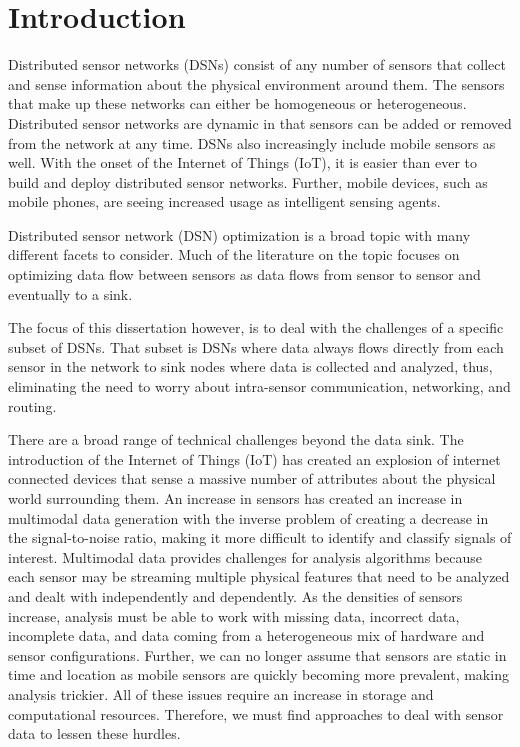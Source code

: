 \chapter{Introduction}\label{ch:introduction}
Distributed sensor networks (DSNs) consist of any number of sensors that collect and sense information about the physical environment around them. The sensors that make up these networks can either be homogeneous or heterogeneous. Distributed sensor networks are dynamic in that sensors can be added or removed from the network at any time. DSNs also increasingly include mobile sensors as well. With the onset of the Internet of Things (IoT), it is easier than ever to build and deploy distributed sensor networks. Further, mobile devices, such as mobile phones, are seeing increased usage as intelligent sensing agents.

Distributed sensor network (DSN) optimization is a broad topic with many different facets to consider. Much of the literature on the topic focuses on optimizing data flow between sensors as data flows from sensor to sensor and eventually to a sink.

The focus of this dissertation however, is to deal with the challenges of a specific subset of DSNs. That subset is DSNs where data always flows directly from each sensor in the network to sink nodes where data is collected and analyzed, thus, eliminating the need to worry about intra-sensor communication, networking, and routing.

There are a broad range of technical challenges beyond the data sink. The introduction of the Internet of Things (IoT) has created an explosion of internet connected devices that sense a massive number of attributes about the physical world surrounding them. An increase in sensors has created an increase in multimodal data generation with the inverse problem of creating a decrease in the signal-to-noise ratio, making it more difficult to identify and classify signals of interest. Multimodal data provides challenges for analysis algorithms because each sensor may be streaming multiple physical features that need to be analyzed and dealt with independently and dependently. As the densities of sensors increase, analysis must be able to work with missing data, incorrect data, incomplete data, and data coming from a heterogeneous mix of hardware and sensor configurations. Further, we can no longer assume that sensors are static in time and location as mobile sensors are quickly becoming more prevalent, making analysis trickier. All of these issues require an increase in storage and computational resources. Therefore, we must find approaches to deal with sensor data to lessen these hurdles.


